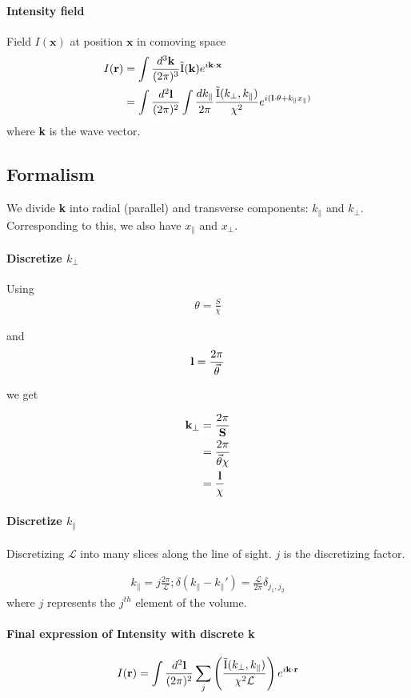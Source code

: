 \documentclass[12pt]{article}
\newcommand{\beq}{\begin{equation}}
\newcommand{\eeq}{\end{equation}}
\newcommand{\beqa}{\begin{eqnarray}}
\newcommand{\eeqa}{\end{eqnarray}}
\newcommand{\beqal}{\begin{aligned}}
\newcommand{\eeqal}{\end{aligned}}
\def\k{{\bf k}}
\def\l{{\bf l}}
\def\r{{\bf r}}
\def\x{{\bf x}}
\def\il{{\tilde{\rm I}}}
\numberwithin{equation}{section}
\begin{document}
\paragraph{Intensity field}
Field $ I(\textbf{x}) $ at position $ \textbf{x} $ in comoving space
\beq
\beqal
I(\textbf{r}) &= \int \frac{d^3\k}{(2\pi)^3} \il(\k) e^{i \k \cdot \x}
\\
&= \int \frac{d^2\l}{(2\pi)^2} \int \frac{dk_{\parallel}}{2\pi} \frac{\il(k_\perp, k_\parallel)}{\chi^2} e^{i(\l\cdot \theta + k_\parallel x_\parallel)}
\eeqal
\eeq
where \textbf{k} is the wave vector.

\subsection{Formalism}
We divide \textbf{k} into radial (parallel) and transverse components: $ k_\parallel $ and $ k_\perp $. Corresponding to this, we also have $ x_\parallel $ and $ x_\perp $.

\paragraph{Discretize $k_\perp$} Using
\beqa
\theta = \frac{S}{\chi}
\eeqa

and 
\beqa
\l = \frac{2 \pi}{\vec{\theta}}
\eeqa

we get 

\beq
\beqal
\k_\perp &= \frac{2 \pi}{\textbf{S}}
\\
&= \frac{2 \pi }{\vec{\theta} \chi}
\\
&= \frac{\l}{\chi}
\eeqal
\eeq

\paragraph{Discretize $ k_\parallel $}Discretizing $ \mathcal{L} $ into many slices along the line of sight. $ j $ is the discretizing factor.

\beqa
k_\parallel  = j\frac{2\pi}{\mathcal{L}}; \delta(k_\parallel - k_\parallel') = \frac{\mathcal{L}}{2\pi} \delta_{j_1, j_2} 
\eeqa
where $ j $ represents the $ j^{th} $ element of the volume.

\paragraph{Final expression of Intensity with discrete \textbf{k}}
\beqa
I(\r) = \int\frac{d^2\l}{(2\pi)^2} \sum_j \left(\frac{\il(k_\perp, k_\parallel)}{\chi^2 \mathcal{L}} \right) e^{i \textbf{k} \cdot \textbf{r}}
\eeqa
\end{document}
